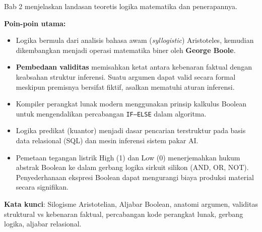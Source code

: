 \documentclass[../main]{subfiles}
\begin{document}
\begin{rangkuman}
Bab 2 menjelaskan landasan teoretis logika matematika dan penerapannya.

\textbf{Poin-poin utama:}
\begin{itemize}
  \item Logika bermula dari analisis bahasa awam (\textit{syllogistic}) Aristoteles, kemudian dikembangkan menjadi operasi matematika biner oleh \textbf{George Boole}.
  \item \textbf{Pembedaan validitas} memisahkan ketat antara kebenaran faktual dengan keabsahan struktur inferensi. Suatu argumen dapat valid secara formal meskipun premisnya bersifat fiktif, asalkan mematuhi aturan inferensi.
  \item Kompiler perangkat lunak modern menggunakan prinsip kalkulus Boolean untuk mengendalikan percabangan \texttt{IF--ELSE} dalam algoritma.
  \item Logika predikat (kuantor) menjadi dasar pencarian terstruktur pada basis data relasional (SQL) dan mesin inferensi sistem pakar AI.
  \item Pemetaan tegangan listrik High (1) dan Low (0) menerjemahkan hukum abstrak Boolean ke dalam gerbang logika sirkuit silikon (AND, OR, NOT). Penyederhanaan ekspresi Boolean dapat mengurangi biaya produksi material secara signifikan.
\end{itemize}

\textbf{Kata kunci}: Silogisme Aristotelian, Aljabar Boolean, anatomi argumen, validitas struktural vs kebenaran faktual, percabangan kode perangkat lunak, gerbang logika, aljabar relasional.
\end{rangkuman}

\ifSubfilesClassLoaded{
  \renewcommand{\bibname}{Daftar Pustaka}
  
  
}{}
\end{document}
